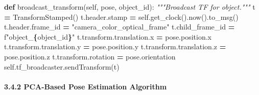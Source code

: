 \documentclass[
]{article}
\newenvironment{Shaded}{\begin{snugshade}}{\end{snugshade}}
\newcommand{\CommentTok}[1]{\textcolor[rgb]{0.56,0.35,0.01}{\textit{#1}}}
\newcommand{\KeywordTok}[1]{\textcolor[rgb]{0.13,0.29,0.53}{\textbf{#1}}}
\newcommand{\NormalTok}[1]{#1}
\newcommand{\OperatorTok}[1]{\textcolor[rgb]{0.81,0.36,0.00}{\textbf{#1}}}
\newcommand{\SpecialCharTok}[1]{\textcolor[rgb]{0.81,0.36,0.00}{\textbf{#1}}}
\newcommand{\SpecialStringTok}[1]{\textcolor[rgb]{0.31,0.60,0.02}{#1}}
\newcommand{\StringTok}[1]{\textcolor[rgb]{0.31,0.60,0.02}{#1}}
\newcommand{\VariableTok}[1]{\textcolor[rgb]{0.00,0.00,0.00}{#1}}
\begin{document}
\begin{Shaded}
\begin{Highlighting}[]
    \KeywordTok{def}\NormalTok{ broadcast\_transform(}\VariableTok{self}\NormalTok{, pose, object\_id):}
        \CommentTok{"""Broadcast TF for object."""}
\NormalTok{        t }\OperatorTok{=}\NormalTok{ TransformStamped()}
\NormalTok{        t.header.stamp }\OperatorTok{=} \VariableTok{self}\NormalTok{.get\_clock().now().to\_msg()}
\NormalTok{        t.header.frame\_id }\OperatorTok{=} \StringTok{"camera\_color\_optical\_frame"}
\NormalTok{        t.child\_frame\_id }\OperatorTok{=} \SpecialStringTok{f"object\_}\SpecialCharTok{\{}\NormalTok{object\_id}\SpecialCharTok{\}}\SpecialStringTok{"}
\NormalTok{        t.transform.translation.x }\OperatorTok{=}\NormalTok{ pose.position.x}
\NormalTok{        t.transform.translation.y }\OperatorTok{=}\NormalTok{ pose.position.y}
\NormalTok{        t.transform.translation.z }\OperatorTok{=}\NormalTok{ pose.position.z}
\NormalTok{        t.transform.rotation }\OperatorTok{=}\NormalTok{ pose.orientation}
        \VariableTok{self}\NormalTok{.tf\_broadcaster.sendTransform(t)}
\end{Highlighting}
\end{Shaded}

\hypertarget{pca-based-pose-estimation-algorithm}{%
\paragraph{3.4.2 PCA-Based Pose Estimation
Algorithm}\label{pca-based-pose-estimation-algorithm}}
\end{document}
